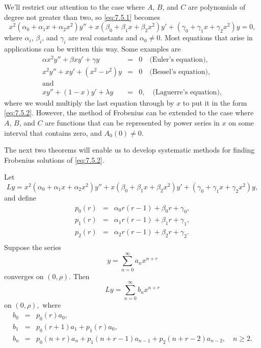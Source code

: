 \documentclass{ximera}
\begin{document}
We'll restrict our attention to the case where $A$, $B$, and $C$ are
polynomials of degree not greater than two, so \eqref{eq:7.5.1} becomes
\begin{equation} \label{eq:7.5.2}
x^2(\alpha_0+\alpha_1x+\alpha_2x^2)y''+x(\beta_0+\beta_1x+\beta_2x^2)y'
+(\gamma_0+\gamma_1x+\gamma_2x^2)y=0,
\end{equation}
where $\alpha_i$, $\beta_i$, and $\gamma_i$ are real constants and
$\alpha_0\neq 0$. Most  equations that arise in
applications can be written this way. Some examples are
\begin{eqnarray*}
\alpha x^2y''+\beta xy'+\gamma y&=&0 \quad\mbox{(Euler's equation)},
\\
x^2y''+xy'+(x^2-\nu^2)y&=&0 \quad\mbox{(Bessel's equation)},\\
\mbox{and}\\
xy''+(1-x)y'+\lambda y&=&0,
\quad\mbox{(Laguerre's equation)},
\end{eqnarray*}
where we would multiply the last equation through by $x$ to put it in
the form \eqref{eq:7.5.2}. However, the method of Frobenius can be
extended to the case where $A$, $B$, and $C$ are functions that can be
represented by power series in $x$ on some interval that contains zero,
and $A_0(0)\neq 0$.

The next two theorems will enable us to develop systematic methods for
finding Frobenius solutions of \eqref{eq:7.5.2}.

\begin{theorem}\label{thmtype:7.5.1}
Let
$$
Ly=
x^2(\alpha_0+\alpha_1x+\alpha_2x^2)y''+x(\beta_0+\beta_1x+\beta_2x^2)y'
+(\gamma_0+\gamma_1x+\gamma_2x^2)y,
$$
and define
\begin{eqnarray*}
p_0(r)&=&\alpha_0r(r-1)+\beta_0r+\gamma_0,\\
p_1(r)&=&\alpha_1r(r-1)+\beta_1r+\gamma_1,\\
p_2(r)&=&\alpha_2r(r-1)+\beta_2r+\gamma_2.\\
\end{eqnarray*}
Suppose the series
\begin{equation} \label{eq:7.5.3}
y=\sum_{n=0}^\infty a_nx^{n+r}
\end{equation}
converges on $(0,\rho)$.
 Then
\begin{equation} \label{eq:7.5.4}
Ly=\sum_{n=0}^\infty b_nx^{n+r}
\end{equation}
on $(0,\rho),$
where
\begin{equation} \label{eq:7.5.5}
\begin{array}{ccl}
b_0&=&p_0(r)a_0,\\
b_1&=&p_0(r+1)a_1+p_1(r)a_0,\\
b_n&=&p_0(n+r)a_n+p_1(n+r-1)a_{n-1}+p_2(n+r-2)a_{n-2},\quad n\geq2.
\end{array}
\end{equation}
\end{theorem}
\end{document}
